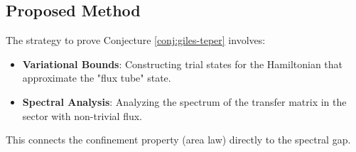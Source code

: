 \subsection{Proposed Method}

The strategy to prove Conjecture \ref{conj:giles-teper} involves:
\begin{itemize}
    \item \textbf{Variational Bounds}: Constructing trial states for the Hamiltonian that approximate the "flux tube" state.
    \item \textbf{Spectral Analysis}: Analyzing the spectrum of the transfer matrix in the sector with non-trivial flux.
\end{itemize}
This connects the confinement property (area law) directly to the spectral gap.


